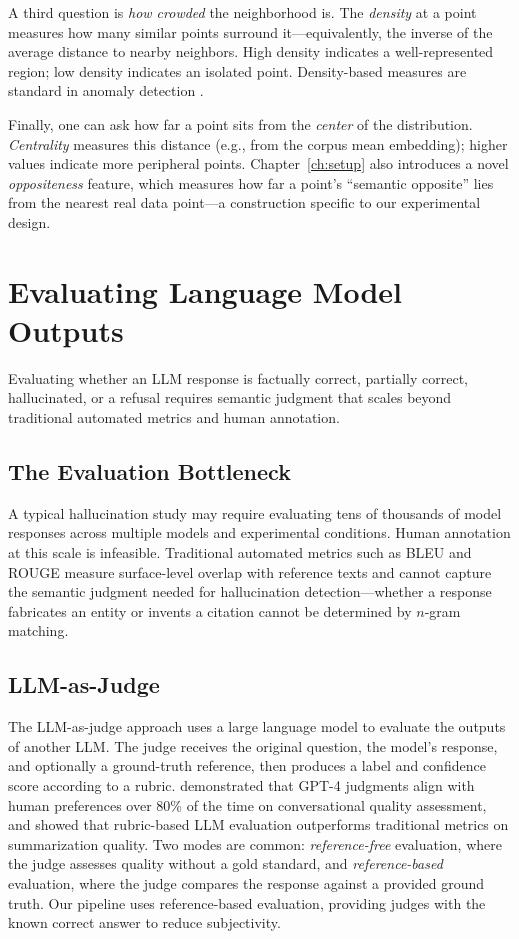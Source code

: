 A third question is \emph{how crowded} the neighborhood is. The \emph{density} at a point measures how many similar points surround it---equivalently, the inverse of the average distance to nearby neighbors. High density indicates a well-represented region; low density indicates an isolated point. Density-based measures are standard in anomaly detection \citep{breunig2000lof}.

Finally, one can ask how far a point sits from the \emph{center} of the distribution. \emph{Centrality} measures this distance (e.g., from the corpus mean embedding); higher values indicate more peripheral points. Chapter~\ref{ch:setup} also introduces a novel \emph{oppositeness} feature, which measures how far a point's ``semantic opposite'' lies from the nearest real data point---a construction specific to our experimental design.

\section{Evaluating Language Model Outputs}
\label{sec:bg-evaluation}

Evaluating whether an LLM response is factually correct, partially correct, hallucinated, or a refusal requires semantic judgment that scales beyond traditional automated metrics and human annotation.

\subsection{The Evaluation Bottleneck}
\label{sec:bg-eval-bottleneck}

A typical hallucination study may require evaluating tens of thousands of model responses across multiple models and experimental conditions. Human annotation at this scale is infeasible. Traditional automated metrics such as BLEU and ROUGE measure surface-level overlap with reference texts and cannot capture the semantic judgment needed for hallucination detection---whether a response fabricates an entity or invents a citation cannot be determined by $n$-gram matching.

\subsection{LLM-as-Judge}
\label{sec:bg-llm-judge}

The LLM-as-judge approach uses a large language model to evaluate the outputs of another LLM. The judge receives the original question, the model's response, and optionally a ground-truth reference, then produces a label and confidence score according to a rubric. \citet{zheng2023judging} demonstrated that GPT-4 judgments align with human preferences over 80\% of the time on conversational quality assessment, and \citet{liu2023geval} showed that rubric-based LLM evaluation outperforms traditional metrics on summarization quality. Two modes are common: \emph{reference-free} evaluation, where the judge assesses quality without a gold standard, and \emph{reference-based} evaluation, where the judge compares the response against a provided ground truth. Our pipeline uses reference-based evaluation, providing judges with the known correct answer to reduce subjectivity.

